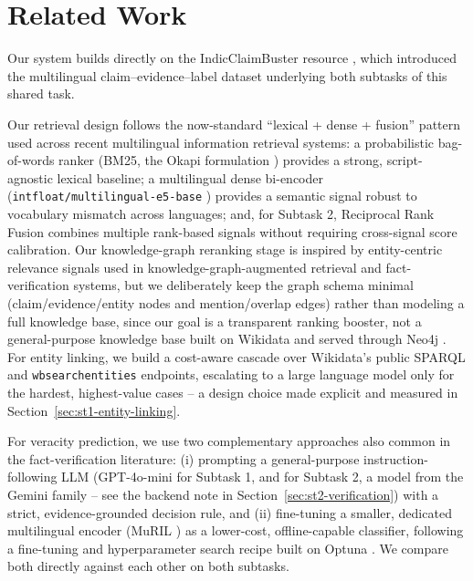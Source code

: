 \documentclass[
]{ceurart}
\begin{document}
\section{Related Work}

Our system builds directly on the IndicClaimBuster resource
\cite{pal-etal-2025-indicclaimbuster}, which introduced the multilingual
claim--evidence--label dataset underlying both subtasks of this shared
task.

Our retrieval design follows the now-standard ``lexical + dense +
fusion'' pattern used across recent multilingual information retrieval
systems: a probabilistic bag-of-words ranker (BM25, the Okapi
formulation \cite{robertson2009probabilistic}) provides a strong,
script-agnostic lexical baseline; a multilingual dense bi-encoder
(\texttt{intfloat/multilingual-e5-base} \cite{wang2024multilingual})
provides a semantic signal robust to vocabulary mismatch across
languages; and, for Subtask 2, Reciprocal Rank Fusion
\cite{cormack2009reciprocal} combines multiple rank-based signals
without requiring cross-signal score calibration. Our knowledge-graph
reranking stage is inspired by entity-centric relevance signals used in
knowledge-graph-augmented retrieval and fact-verification systems, but
we deliberately keep the graph schema minimal (claim/evidence/entity
nodes and mention/overlap edges) rather than modeling a full knowledge
base, since our goal is a transparent ranking booster, not a
general-purpose knowledge base built on Wikidata
\cite{vrandecic2014wikidata} and served through Neo4j \cite{neo4j}. For
entity linking, we build a cost-aware cascade over Wikidata's public
SPARQL and \texttt{wbsearchentities} endpoints, escalating to a large
language model only for the hardest, highest-value cases -- a design
choice made explicit and measured in
Section~\ref{sec:st1-entity-linking}.

For veracity prediction, we use two complementary approaches also common
in the fact-verification literature: (i) prompting a general-purpose
instruction-following LLM (GPT-4o-mini \cite{openai2024gpt4omini} for
Subtask 1, and for Subtask 2, a model from the Gemini family
\cite{geminiteam2023gemini} -- see the backend note in
Section~\ref{sec:st2-verification}) with a strict, evidence-grounded
decision rule, and (ii) fine-tuning a smaller, dedicated multilingual
encoder (MuRIL \cite{khanuja2021muril}) as a lower-cost,
offline-capable classifier, following a fine-tuning and hyperparameter
search recipe built on Optuna \cite{optuna}. We compare both directly
against each other on both subtasks.
\end{document}

